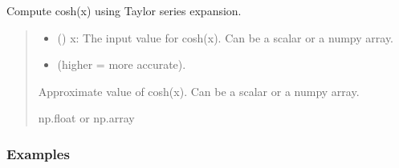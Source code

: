 \documentclass[letterpaper,10pt,english]{sphinxmanual}
\begin{document}
\begin{fulllineitems}
\label{\detokenize{index:ascefunctions.taylors_series.trig_functions.cosh}}
\pysigstartsignatures
\pysiglinewithargsret
{}
{\sphinxparamcomma {}}
{}
\pysigstopsignatures
\sphinxAtStartPar
Compute cosh(x) using Taylor series expansion.
\begin{quote}\begin{description}
\begin{itemize}
\item {} 
\sphinxAtStartPar
{} () \textendash{} x: The input value for cosh(x). Can be a scalar or a numpy array.

\item {} 
\sphinxAtStartPar
{} \textendash{} \begin{description}
\sphinxAtStartPar
(higher = more accurate).

\end{description}


\end{itemize}

\sphinxAtStartPar
Approximate value of cosh(x). Can be a scalar or a numpy array.

\sphinxAtStartPar
np.float or np.array

\end{description}\end{quote}
\subsubsection*{Examples}

\begin{sphinxVerbatim}[commandchars=\\\{\}]
\end{sphinxVerbatim}


\end{fulllineitems}
\end{document}
